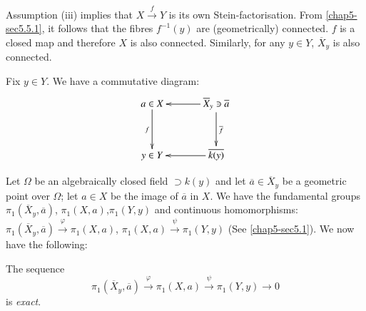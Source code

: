 Assumption (iii) implies that $X\xrightarrow{f}Y$ is its own
Stein-factorisation. From \ref{chap5-sec5.5.1}, it follows that the fibres
$f^{-1}(y)$ are (geometrically) connected. $f$ is a closed map and
therefore $X$ is also connected. Similarly, for any $y\in Y$,
$\overline{X}_{y}$ is also connected.

Fix $y\in Y$. We have a commutative diagram:
\[
\xymatrix@=1.2cm{
a\in X\ar[d]_{f} & \overline{X}_{y}\ni
\overline{a}\ar[l]\ar[d]^{\overline{f}}\\
y\in Y & \overline{k(y)}\ar[l] 
}
\]

Let $\Omega$ be an algebraically closed field $\supset k(y)$ and let
$\overline{a}\in\overline{X}_{y}$ be a geometric point over $\Omega$;
let $a\in X$ be the image of $\overline{a}$ in $X$. We have the
fundamental groups $\pi_{1}(\overline{X}_{y},\overline{a})$,
$\pi_{1}(X,a)$,\pageoriginale $\pi_{1}(Y,y)$ and continuous homomorphisms:
$\pi_{1}(\overline{X}_{y},\overline{a})\xrightarrow{\varphi}\pi_{1}(X,a)$,
$\pi_{1}(X,a)\xrightarrow{\psi}\pi_{1}(Y,y)$ (See \ref{chap5-sec5.1}). We
now have the following:

\setcounter{subsection}{2}
\begin{subtheorem}\label{chap6-thm6.3.2.1}
The sequence
$$
\pi_{1}(\overline{X}_{y},\overline{a})\xrightarrow{\varphi}\pi_{1}(X,a)\xrightarrow{\psi}\pi_{1}(Y,y)\to
0
$$
is {\em exact}.
\end{subtheorem}


